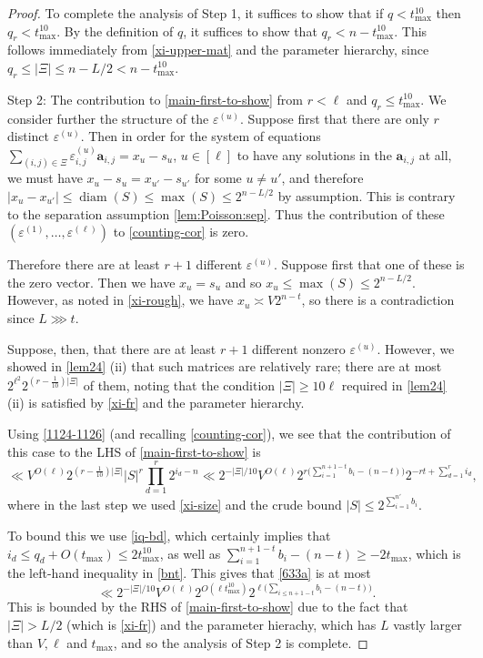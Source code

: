 \documentclass[11pt,reqno]{amsart}
\numberwithin{equation}{section}
\theoremstyle{definition}
\theoremstyle{remark}
\newcommand{\mbf}{\mathbf}
\newcommand{\eps}{\varepsilon}
\renewcommand{\le}{\leqslant}
\renewcommand{\ge}{\geqslant}
\begin{document}
\begin{proof}
To complete the analysis of Step 1, it suffices to show that if $q < t_{\max}^{10}$ then $q_r < t_{\max}^{10}$. By the definition of $q$, it suffices to show that $q_r < n - t_{\max}^{10}$. This follows immediately from \cref{xi-upper-mat} and the parameter hierarchy, since $q_r \le |\Xi| \le n - L/2 < n - t_{\max}^{10}$. \vspace*{8pt} 

Step 2: The contribution to \cref{main-first-to-show} from $r < \ell$ and $q_r \le t_{\max}^{10}$.  We consider further the structure of the $\eps^{(u)}$. Suppose first that there are only $r$ distinct $\eps^{(u)}$. Then in order for the system of equations $\sum_{(i,j) \in \Xi} \eps_{i,j}^{(u)}\mbf{a}_{i,j}  = x_u - s_u$, $u \in [\ell]$ to have any solutions in the $\mbf{a}_{i,j}$ at all, we must have $x_u - s_u = x_{u'} - s_{u'}$ for some $u \ne u'$, and therefore $|x_u - x_{u'}| \le \operatorname{diam}(S) \le \max(S) \le 2^{n - L/2}$ by assumption. This is contrary to the separation assumption \cref{lem:Poisson:sep}.
 Thus the contribution of these $(\eps^{(1)},\dots, \eps^{(\ell)})$ to \cref{counting-cor} is zero.

Therefore there are at least $r+1$ different $\eps^{(u)}$. Suppose first that one of these is the zero vector. Then we have $x_u = s_u$ and so $x_u \le \max(S) \le 2^{n - L/2}$. However, as noted in \cref{xi-rough}, we have $x_u \asymp V 2^{n - t}$, so there is a contradiction since $L \ggg t$.


Suppose, then, that there are at least $r+1$ different nonzero $\eps^{(u)}$. However, we showed in \cref{lem24} (ii) that such matrices are relatively rare; there are at most $2^{\ell^2} 2^{(r - \frac{1}{10}) |\Xi|}$ of them, noting that the condition $|\Xi| \ge 10\ell$ required in \cref{lem24} (ii) is satisfied by \cref{xi-fr} and the parameter hierarchy.

Using \cref{1124-1126} (and recalling \cref{counting-cor}), we see that the contribution of this case to the LHS of \cref{main-first-to-show} is
\begin{equation}\label{633a} \ll V^{O(\ell)} 2^{(r - \frac{1}{10})|\Xi|}|S|^r \prod_{d = 1}^r 2^{i_d - n} \ll 2^{-|\Xi|/10}V^{O(\ell)} 2^{r \big( \sum_{i=1}^{n + 1 - t} b_i - (n - t) \big)} 2^{-rt + \sum_{d = 1}^r i_d}, \end{equation}
where in the last step we used \cref{xi-size} and the crude bound $|S| \le 2^{\sum_{i =1}^{n'} b_i}$.


To bound this we use \cref{iq-bd}, which certainly implies that $i_d \le q_d + O(t_{\max}) \le 2t_{\max}^{10}$, as well as $\sum_{i =1}^{n + 1 - t} b_i - (n - t) \ge - 2t_{\max}$, which is the left-hand inequality in \cref{bnt}. This gives that \cref{633a} is at most 
\[ \ll 2^{-|\Xi|/10} V^{O(\ell)} 2^{O(\ell t_{\max}^{10})} 2^{\ell \big(\sum_{i \le n + 1 - t} b_i - (n - t)\big)} . \]
This is bounded by the RHS of \cref{main-first-to-show} due to the fact that $|\Xi| > L/2$ (which is \cref{xi-fr}) and the parameter hierachy, which has $L$ vastly larger than $V, \ell$ and $t_{\max}$, and so the analysis of Step 2 is complete.\vspace*{8pt}


\end{proof}
\end{document}
